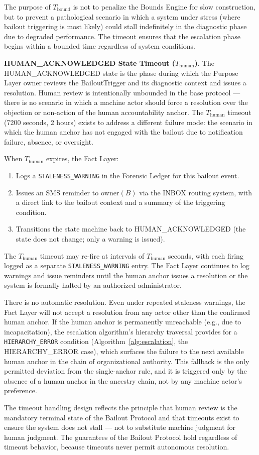 The purpose of $T_{\text{bound}}$ is not to penalize the Bounds Engine for slow construction, but to prevent a pathological scenario in which a system under stress (where bailout triggering is most likely) could stall indefinitely in the diagnostic phase due to degraded performance. The timeout ensures that the escalation phase begins within a bounded time regardless of system conditions.

\bigskip

\noindent\textbf{HUMAN\_ACKNOWLEDGED State Timeout ($T_{\text{human}}$).} The HUMAN\_ACKNOWLEDGED state is the phase during which the Purpose Layer owner reviews the BailoutTrigger and its diagnostic context and issues a resolution. Human review is intentionally unbounded in the base protocol --- there is no scenario in which a machine actor should force a resolution over the objection or non-action of the human accountability anchor. The $T_{\text{human}}$ timeout (7200 seconds, 2 hours) exists to address a different failure mode: the scenario in which the human anchor has not engaged with the bailout due to notification failure, absence, or oversight.

When $T_{\text{human}}$ expires, the Fact Layer:
\begin{enumerate}\setlength\itemsep{0.25em}
\item Logs a \texttt{STALENESS\_WARNING} in the Forensic Ledger for this bailout event.
\item Issues an SMS reminder to $\text{owner}(B)$ via the INBOX routing system, with a direct link to the bailout context and a summary of the triggering condition.
\item Transitions the state machine back to HUMAN\_ACKNOWLEDGED (the state does not change; only a warning is issued).
\end{enumerate}

The $T_{\text{human}}$ timeout may re-fire at intervals of $T_{\text{human}}$ seconds, with each firing logged as a separate \texttt{STALENESS\_WARNING} entry. The Fact Layer continues to log warnings and issue reminders until the human anchor issues a resolution or the system is formally halted by an authorized administrator.

There is no automatic resolution. Even under repeated staleness warnings, the Fact Layer will not accept a resolution from any actor other than the confirmed human anchor. If the human anchor is permanently unreachable (e.g., due to incapacitation), the escalation algorithm's hierarchy traversal provides for a \texttt{HIERARCHY\_ERROR} condition (Algorithm~\ref{alg:escalation}, the HIERARCHY\_ERROR case), which surfaces the failure to the next available human anchor in the chain of organizational authority. This fallback is the only permitted deviation from the single-anchor rule, and it is triggered only by the absence of a human anchor in the ancestry chain, not by any machine actor's preference.

The timeout handling design reflects the principle that human review is the mandatory terminal state of the Bailout Protocol and that timeouts exist to ensure the system does not stall --- not to substitute machine judgment for human judgment. The guarantees of the Bailout Protocol hold regardless of timeout behavior, because timeouts never permit autonomous resolution.
